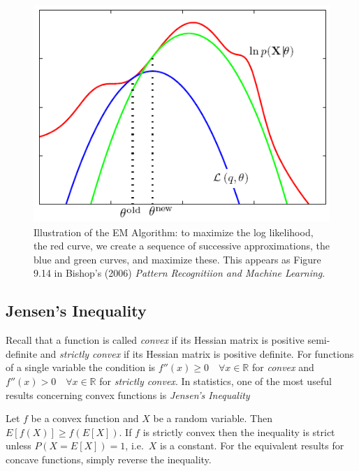 \begin{figure}
	\centering
	\includegraphics[scale=0.5]{../img/EM_algorithm}
	\caption{Illustration of the EM Algorithm: to maximize the log likelihood, the red curve, we create a sequence of successive approximations, the blue and green curves, and maximize these. This appears as Figure 9.14 in Bishop's (2006) \emph{Pattern Recognitiion and Machine Learning}.}
\end{figure}

\subsection{Jensen's Inequality}
Recall that a function is called \emph{convex} if its Hessian matrix is positive semi-definite and \emph{strictly convex} if its Hessian matrix is positive definite. For functions of a single variable the condition is $f''(x)\geq 0 \quad \forall x\in\mathbb{R}$ for \emph{convex} and $f''(x)> 0 \quad \forall x\in\mathbb{R}$ for \emph{strictly convex}. In statistics, one of the most useful results concerning convex functions is \emph{Jensen's Inequality}
\begin{pro}
 	Let $f$ be a convex function and $X$ be a random variable. Then $E[f(X)]\geq f(E[X])$. If $f$ is strictly convex then the inequality is strict unless $P(X = E[X]) = 1$, i.e.\ $X$ is a constant. For the equivalent results for concave functions, simply reverse the inequality.
 \end{pro} 



